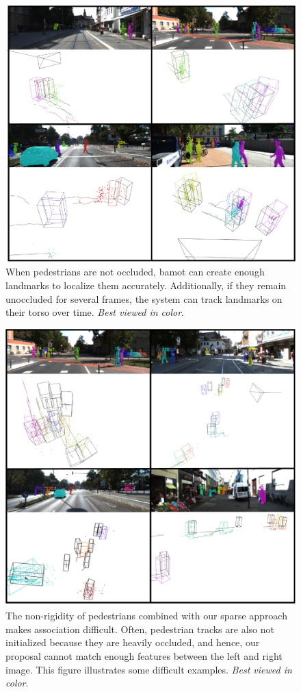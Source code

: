 \documentclass[headsepline, hidelinks, footsepline, footinclude=false, oneside, fontsize=11pt, paper=a4, listof=totoc, bibliography=totoc]{scrbook}
\begin{document}
\begin{figure}[htbp]
\centering
\includegraphics[width=\textwidth]{figures/peds-good.pdf}
\caption{\label{fig:pedestrians-good}When pedestrians are not occluded, \gls{bamot} can create enough landmarks to localize them accurately. Additionally, if they remain unoccluded for several frames, the system can track landmarks on their torso over time. \emph{Best viewed in color}.}
\end{figure}

\begin{figure}[htbp]
\centering
\includegraphics[width=\textwidth]{figures/peds-bad.pdf}
\caption{\label{fig:pedestrians-bad}The non-rigidity of pedestrians combined with our sparse approach makes association difficult. Often, pedestrian tracks are also not initialized because they are heavily occluded, and hence, our proposal cannot match enough features between the left and right image. This figure illustrates some difficult examples. \emph{Best viewed in color}.}
\end{figure}
\end{document}
